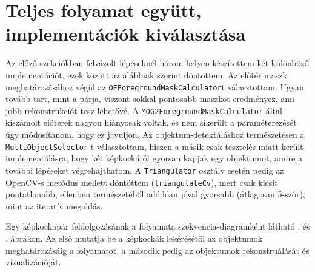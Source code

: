 \section{Teljes folyamat együtt, implementációk kiválasztása}

Az előző szekciókban felvázolt lépéseknél három helyen készítettem két különböző implementációt, ezek között az alábbiak szerint döntöttem. Az előtér maszk meghatározásához végül az \texttt{OFForegroundMaskCalculator}t választottam. Ugyan tovább tart, mint a párja, viszont sokkal pontosabb maszkot eredményez, ami jobb rekonstrukciót tesz lehetővé. A \texttt{MOG2ForegroundMaskCalculator} által kiszámolt előterek nagyon hiányosak voltak, és nem sikerült a paraméterezését úgy módosítanom, hogy ez javuljon. Az objektum-detektáláshoz természetesen a \texttt{MultiObjectSelector}-t választottam, hiszen a másik csak tesztelés miatt került implementálásra, hogy két képkockáról gyorsan kapjak egy objektumot, amire a további lépéseket végrehajthatom. A \texttt{Triangulator} osztály esetén pedig az OpenCV-s metódus mellett döntöttem (\texttt{triangulateCv}), mert csak kicsit pontatlanabb, ellenben természetéből adódóan jóval gyorsabb (átlagosan 5-ször), mint az iteratív megoldás.

Egy képkockapár feldolgozásának a folyamata szekvencia-diagramként látható . és . ábrákon. Az első mutatja be a képkockák lekérésétől az objektumok meghatározásáig a folyamatot, a második pedig az objektumok rekonstruálását és vizualizációját.

